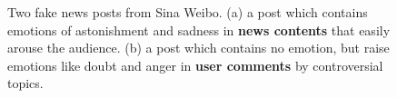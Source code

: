 \documentclass{article}
\newcommand{\kai}[1]{\textcolor{blue}{Kai: {#1}}}
\begin{document}
	\begin{figure}
		\centering
		\begin{minipage}[t]{0.22\textwidth}
		\end{minipage}
		\begin{minipage}[t]{0.23\textwidth}
		\end{minipage}
		\caption{Two fake news posts from Sina Weibo. (a) a post which contains emotions of astonishment and sadness in \textbf{news contents} that easily arouse the audience. (b) a post which contains no emotion, but raise emotions like doubt and anger in \textbf{user comments} by controversial topics.}
		\vspace{-0.3cm}
		\label{Fig:introcase}
	\end{figure}
	
	
\end{document}
